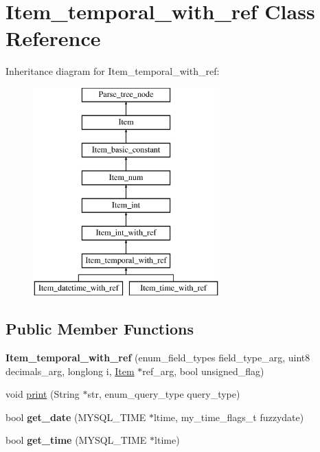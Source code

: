 \hypertarget{classItem__temporal__with__ref}{}\section{Item\+\_\+temporal\+\_\+with\+\_\+ref Class Reference}
\label{classItem__temporal__with__ref}
Inheritance diagram for Item\+\_\+temporal\+\_\+with\+\_\+ref\+:\begin{figure}[H]
\begin{center}
\leavevmode
\includegraphics[height=8.000000cm]{classItem__temporal__with__ref}
\end{center}
\end{figure}
\subsection*{Public Member Functions}
\begin{DoxyCompactItemize}
\item 
\mbox{\label{classItem__temporal__with__ref_ab7c88b3d8beb8b4b423e0d8d8df4ccd7}} 
{\bfseries Item\+\_\+temporal\+\_\+with\+\_\+ref} (enum\+\_\+field\+\_\+types field\+\_\+type\+\_\+arg, uint8 decimals\+\_\+arg, longlong i, \mbox{\hyperlink{classItem}{Item}} $\ast$ref\+\_\+arg, bool unsigned\+\_\+flag)
\item 
void \mbox{\hyperlink{classItem__temporal__with__ref_ab32f4567ebd0183a399f1a0b8c66e2e8}{print}} (String $\ast$str, enum\+\_\+query\+\_\+type query\+\_\+type)
\item 
\mbox{\label{classItem__temporal__with__ref_aa99517a576c435c39602d16aa2082204}} 
bool {\bfseries get\+\_\+date} (M\+Y\+S\+Q\+L\+\_\+\+T\+I\+ME $\ast$ltime, my\+\_\+time\+\_\+flags\+\_\+t fuzzydate)
\item 
\mbox{\label{classItem__temporal__with__ref_a8cef774a50d81722e0a01db4377c653a}} 
bool {\bfseries get\+\_\+time} (M\+Y\+S\+Q\+L\+\_\+\+T\+I\+ME $\ast$ltime)
\end{DoxyCompactItemize}
